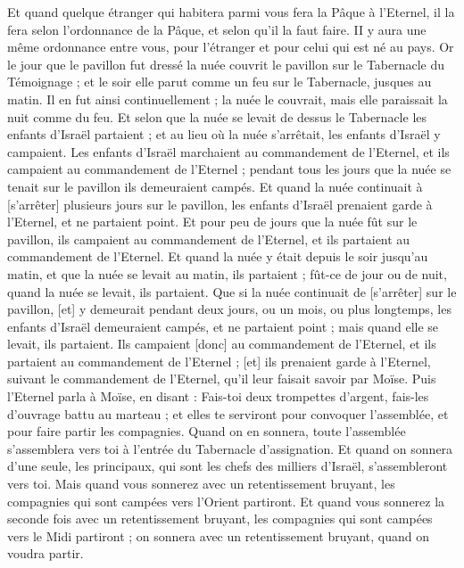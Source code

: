 \begin{multicols}{2}
Et quand quelque étranger qui habitera parmi vous fera la Pâque à l'Eternel, il la fera selon l'ordonnance de la Pâque, et selon qu'il la faut faire. II y aura une même ordonnance entre vous, pour l'étranger et pour celui qui est né au pays.
Or le jour que le pavillon fut dressé la nuée couvrit le pavillon sur le Tabernacle du Témoignage ; et le soir elle parut comme un feu sur le Tabernacle, jusques au matin.
Il en fut ainsi continuellement ; la nuée le couvrait, mais elle paraissait la nuit comme du feu.
Et selon que la nuée se levait de dessus le Tabernacle les enfants d'Israël partaient ; et au lieu où la nuée s'arrêtait, les enfants d'Israël y campaient.
Les enfants d'Israël marchaient au commandement de l'Eternel, et ils campaient au commandement de l'Eternel ; pendant tous les jours que la nuée se tenait sur le pavillon ils demeuraient campés.
Et quand la nuée continuait à [s'arrêter] plusieurs jours sur le pavillon, les enfants d'Israël prenaient garde à l'Eternel, et ne partaient point.
Et pour peu de jours que la nuée fût sur le pavillon, ils campaient au commandement de l'Eternel, et ils partaient au commandement de l'Eternel.
Et quand la nuée y était depuis le soir jusqu'au matin, et que la nuée se levait au matin, ils partaient ; fût-ce de jour ou de nuit, quand la nuée se levait, ils partaient.
Que si la nuée continuait de [s'arrêter] sur le pavillon, [et] y demeurait pendant deux jours, ou un mois, ou plus longtemps, les enfants d'Israël demeuraient campés, et ne partaient point ; mais quand elle se levait, ils partaient.
Ils campaient [donc] au commandement de l'Eternel, et ils partaient au commandement de l'Eternel ; [et] ils prenaient garde à l'Eternel, suivant le commandement de l'Eternel, qu'il leur faisait savoir par Moïse.
\VerseOne{}Puis l'Eternel parla à Moïse, en disant :
Fais-toi deux trompettes d'argent, fais-les d'ouvrage battu au marteau ; et elles te serviront pour convoquer l'assemblée, et pour faire partir les compagnies.
Quand on en sonnera, toute l'assemblée s'assemblera vers toi à l'entrée du Tabernacle d'assignation.
Et quand on sonnera d'une seule, les principaux, qui sont les chefs des milliers d'Israël, s'assembleront vers toi.
Mais quand vous sonnerez avec un retentissement bruyant, les compagnies qui sont campées vers l'Orient partiront.
Et quand vous sonnerez la seconde fois avec un retentissement bruyant, les compagnies qui sont campées vers le Midi partiront ; on sonnera avec un retentissement bruyant, quand on voudra partir.

\end{multicols}
